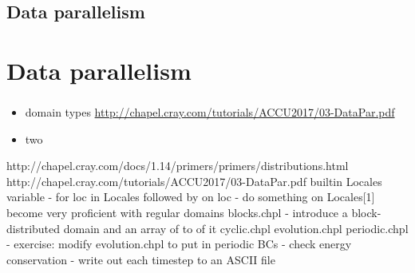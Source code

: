 
\section{Data parallelism}
\chapter{Data parallelism}
\subsection{} %

\begin{frame}{}
  \begin{itemize}\setlength{\itemsep}{3mm}
    \item domain types \url{http://chapel.cray.com/tutorials/ACCU2017/03-DataPar.pdf}
    \item two
  \end{itemize}
\end{frame}


http://chapel.cray.com/docs/1.14/primers/primers/distributions.html
http://chapel.cray.com/tutorials/ACCU2017/03-DataPar.pdf
builtin Locales variable
- for loc in Locales {} followed by on loc {}
- do something on Locales[1]
become very proficient with regular domains
blocks.chpl
- introduce a block-distributed domain and an array of to of it
cyclic.chpl
evolution.chpl
periodic.chpl
- exercise: modify evolution.chpl to put in periodic BCs
- check energy conservation
- write out each timestep to an ASCII file
